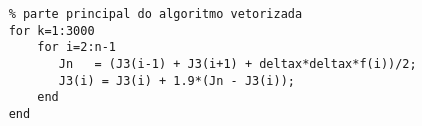 \lstset{language=Matlab}
\begin{lstlisting}
    % parte principal do algoritmo vetorizada
    for k=1:3000
	    for i=2:n-1     
	       Jn   = (J3(i-1) + J3(i+1) + deltax*deltax*f(i))/2;
	       J3(i) = J3(i) + 1.9*(Jn - J3(i));
	    end
    end
	 
\end{lstlisting}